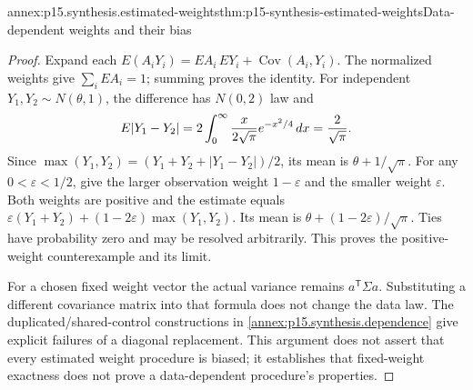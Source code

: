 \begin{annexitem}{annex:p15.synthesis.estimated-weights}{thm:p15-synthesis-estimated-weights}{Data-dependent weights and their bias}
\begin{proof}
Expand each \(E(A_iY_i)=EA_i\,EY_i+\operatorname{Cov}(A_i,Y_i)\).
The normalized weights give \(\sum_iEA_i=1\); summing proves the identity.
For independent \(Y_1,Y_2\sim N(\theta,1)\), the difference has
\(N(0,2)\) law and
\[
 E|Y_1-Y_2|=2\int_0^\infty {x\over2\sqrt\pi}e^{-x^2/4}\,dx
                  ={2\over\sqrt\pi}.
\]
Since \(\max(Y_1,Y_2)=(Y_1+Y_2+|Y_1-Y_2|)/2\), its mean is
\(\theta+1/\sqrt\pi\). For any \(0<\varepsilon<1/2\), give the
larger observation weight \(1-\varepsilon\) and the smaller weight
\(\varepsilon\). Both weights are positive and the estimate equals
\(\varepsilon(Y_1+Y_2)+(1-2\varepsilon)\max(Y_1,Y_2)\).
Its mean is \(\theta+(1-2\varepsilon)/\sqrt\pi\). Ties have probability
zero and may be resolved arbitrarily. This proves the positive-weight
counterexample and its limit.

For a chosen fixed weight vector the actual variance remains
\(a^{\mathsf T}\Sigma a\). Substituting a different covariance matrix
into that formula does not change the data law. The duplicated/shared-control
constructions in \ref{annex:p15.synthesis.dependence} give explicit failures
of a diagonal replacement. This argument does not assert that every estimated
weight procedure is biased; it establishes that fixed-weight exactness does
not prove a data-dependent procedure's properties.
\end{proof}
\end{annexitem}

